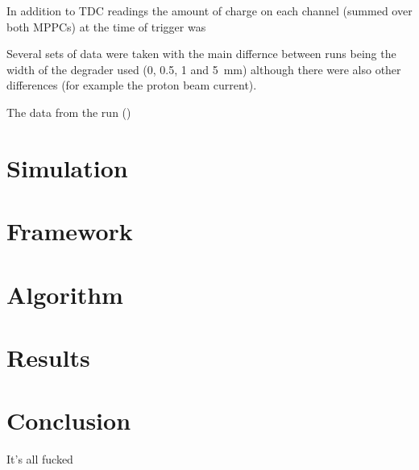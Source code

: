 \documentclass[]{article}
\begin{document}
In addition to TDC readings the amount of charge on each channel (summed over both MPPCs) at the time of trigger was 

Several sets of data were taken with the main differnce between runs being the width of the degrader used (0, 0.5, 1 and 5~mm) although there were also other differences (for example the proton beam current). 

The data from the run ()

\section{Simulation}
\section{Framework}
\section{Algorithm}
\section{Results}
\section{Conclusion}
It's all fucked



\end{document}
